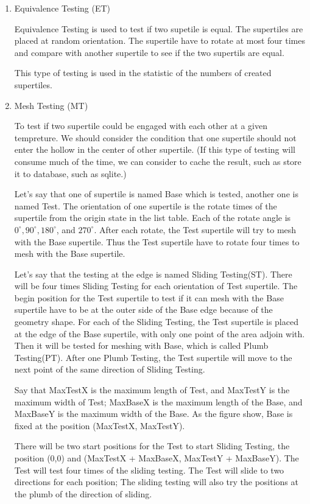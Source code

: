 \documentclass[preprint,natbib,10pt]{article}
\begin{document}
\begin{enumerate}
  \item Equivalence Testing (ET)

Equivalence Testing is used to test if two supetile is equal. The supertiles are placed at random orientation. The supertile have to rotate at most four times and compare with another supertile to see if the two supertils are equal. 

This type of testing is used in the statistic of the numbers of created supertiles.

  \item Mesh Testing (MT)

To test if two supertile could be engaged with each other at a given tempreture. We should consider the condition that one supertile should not enter the hollow in the center of other supertile. (If this type of testing will consume much of the time, we can consider to cache the result, such as store it to database, such as sqlite.)

Let's say that one of supertile is named Base which is tested, another one is named Test.
The orientation of one supertile is the rotate times of the supertile from the origin state in the list table. Each of the rotate angle is $0^{\circ}, 90^{\circ}, 180^{\circ}$, and $270^{\circ}$. After each rotate, the Test supertile will try to mesh with the Base supertile. Thus the Test supertile have to rotate four times to mesh with the Base supertile.

 Let's say that the testing at the edge is named Sliding Testing(ST). There will be four times Sliding Testing for each orientation of Test supertile. The begin position for the Test supertile to test if it can mesh with the Base supertile have to be at the outer side of the Base edge because of the geometry shape. For each of the Sliding Testing, the Test supertile is placed at the edge of the Base supertile, with only one point of the area adjoin with. Then it will be tested for meshing with Base, which is called Plumb Testing(PT). After one Plumb Testing, the Test supertile will move to the next point of the same direction of Sliding Testing.

Say that MaxTestX is the maximum length of Test, and MaxTestY is the maximum width of Test; MaxBaseX is the maximum length of the Base, and MaxBaseY is the maximum width of the Base. As the figure show, Base is fixed at the position (MaxTestX, MaxTestY).

There will be two start positions for the Test to start Sliding Testing, the position (0,0) and (MaxTestX + MaxBaseX, MaxTestY + MaxBaseY). The Test will test four times of the sliding testing. The Test will slide to two directions for each position; The sliding testing will also try the positions at the plumb of the direction of sliding.


\end{enumerate}
\end{document}
